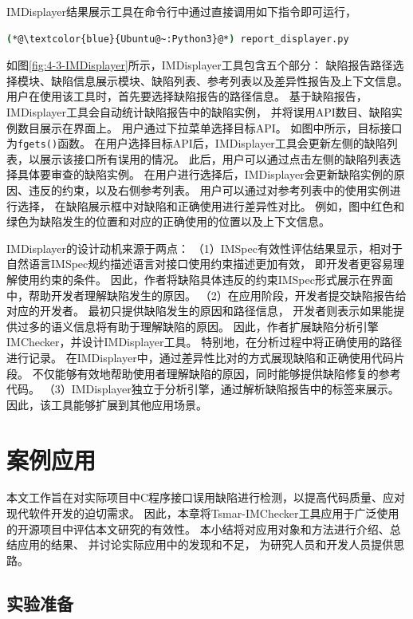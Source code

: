 IMDisplayer结果展示工具在命令行中通过直接调用如下指令即可运行，
\begin{lstlisting}[language={bash},
basicstyle=\linespread{0.8}\listingsfont,
numbers=none,
xleftmargin=.3\textwidth]
(*@\textcolor{blue}{Ubuntu@~:Python3}@*) report_displayer.py
\end{lstlisting}
如图\ref{fig:4-3-IMDisplayer}所示，IMDisplayer工具包含五个部分：
缺陷报告路径选择模块、缺陷信息展示模块、缺陷列表、参考列表以及差异性报告及上下文信息。
用户在使用该工具时，首先要选择缺陷报告的路径信息。
基于缺陷报告，IMDisplayer工具会自动统计缺陷报告中的缺陷实例，
并将误用API数目、缺陷实例数目展示在界面上。
用户通过下拉菜单选择目标API。
如图中所示，目标接口为\texttt{fgets()}函数。
在用户选择目标API后，IMDisplayer工具会更新左侧的缺陷列表，以展示该接口所有误用的情况。
此后，用户可以通过点击左侧的缺陷列表选择具体要审查的缺陷实例。
在用户进行选择后，IMDisplayer会更新缺陷实例的原因、违反的约束，以及右侧参考列表。
用户可以通过对参考列表中的使用实例进行选择，
在缺陷展示框中对缺陷和正确使用进行差异性对比。
例如，图中红色和绿色为缺陷发生的位置和对应的正确使用的位置以及上下文信息。

IMDisplayer的设计动机来源于两点：
（1）IMSpec有效性评估结果显示，相对于自然语言IMSpec规约描述语言对接口使用约束描述更加有效，
即开发者更容易理解使用约束的条件。
因此，作者将缺陷具体违反的约束IMSpec形式展示在界面中，帮助开发者理解缺陷发生的原因。
（2）在应用阶段，开发者提交缺陷报告给对应的开发者。
最初只提供缺陷发生的原因和路径信息，
开发者则表示如果能提供过多的语义信息将有助于理解缺陷的原因。
因此，作者扩展缺陷分析引擎IMChecker，并设计IMDisplayer工具。
特别地，在分析过程中将正确使用的路径进行记录。
在IMDisplayer中，通过差异性比对的方式展现缺陷和正确使用代码片段。
不仅能够有效地帮助使用者理解缺陷的原因，同时能够提供缺陷修复的参考代码。
（3）IMDisplayer独立于分析引擎，通过解析缺陷报告中的标签来展示。
因此，该工具能够扩展到其他应用场景。

\section{案例应用}
\label{sec:4.4}
本文工作旨在对实际项目中C程序接口误用缺陷进行检测，以提高代码质量、应对现代软件开发的迫切需求。
因此，本章将Tsmar-IMChecker工具应用于广泛使用的开源项目中评估本文研究的有效性。
本小结将对应用对象和方法进行介绍、总结应用的结果、
并讨论实际应用中的发现和不足，
为研究人员和开发人员提供思路。

\subsection{实验准备}
